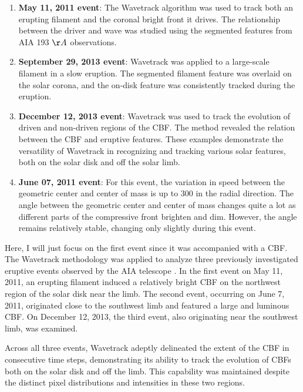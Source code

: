 \begin{enumerate}
	\item \textbf{May 11, 2011 event}:
	The Wavetrack algorithm was used to track both an erupting filament and the coronal bright front it drives. The relationship between the driver and wave was studied using the segmented features from AIA 193 $\AA$ observations.
	
	\item \textbf{September 29, 2013 event}: Wavetrack was applied to a large-scale filament in a slow eruption. The segmented filament feature was overlaid on the solar corona, and the on-disk feature was consistently tracked during the eruption.
	
	\item \textbf{December 12, 2013 event}: Wavetrack was used to track the evolution of driven and non-driven regions of the CBF. The method revealed the relation between the CBF and eruptive features. These examples demonstrate the versatility of Wavetrack in recognizing and tracking various solar features, both on the solar disk and off the solar limb.
	
	\item \textbf{June 07, 2011 event}: For this event, the variation in speed between the geometric center and center of mass is up to 300 \kms in the radial direction. The angle between the geometric center and center of mass changes quite a lot as different parts of the compressive front brighten and dim. However, the angle remains relatively stable, changing only slightly during this event.
\end{enumerate}

Here, I will just focus on the first event since it was accompanied with a CBF.
The Wavetrack methodology was applied to analyze three previously investigated eruptive events observed by the AIA telescope \citep{kozarev_2015, kozarev_2017}. In the first event on May 11, 2011, an erupting filament induced a relatively bright CBF on the northwest region of the solar disk near the limb. The second event, occurring on June 7, 2011, originated close to the southwest limb and featured a large and luminous CBF. On December 12, 2013, the third event, also originating near the southwest limb, was examined.

Across all three events, Wavetrack adeptly delineated the extent of the CBF in consecutive time steps, demonstrating its ability to track the evolution of CBFs both on the solar disk and off the limb. This capability was maintained despite the distinct pixel distributions and intensities in these two regions.

